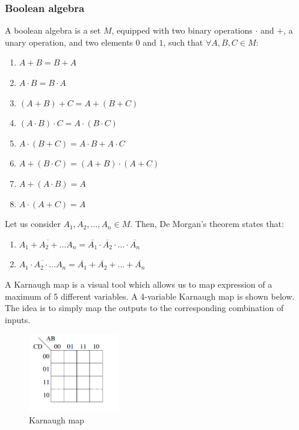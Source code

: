 \documentclass{article}
\begin{document}
\subsubsection{Boolean algebra}

\begin{definition}
    A boolean algebra is a set $M$, equipped with two binary operations $\cdot$ and $+$, a unary operation, and two elements $0$ and $1$, such that $\forall A, B, C \in M$:
    \begin{enumerate}
        \item $A + B = B + A$
        \item $A \cdot B = B \cdot A$
        \item $(A + B) + C = A + (B + C)$
        \item $(A \cdot B) \cdot C = A \cdot (B \cdot C)$
        \item $A \cdot (B + C) = A \cdot B + A \cdot C$
        \item $A + (B \cdot C) = (A + B) \cdot (A + C)$
        \item $A + (A \cdot B) = A$
        \item $A \cdot (A + C) = A$ 
    \end{enumerate}
\end{definition}

\begin{theorem}
    Let us consider $A_1, A_2, \ldots, A_n \in M$. Then, De Morgan's theorem states that:
    \begin{enumerate}
        \item $\overline{A_1 + A_2 + \ldots A_n} = \overline{A_1} \cdot \overline{A_2} \cdot \ldots \cdot \overline{A_n}$
        \item $\overline{A_1 \cdot A_2 \cdot \ldots A_n} = \overline{A_1} + \overline{A_2} + \ldots + \overline{A_n}$
    \end{enumerate}
\end{theorem}

\begin{proposition}
    A Karnaugh map is a visual tool which allows us to map expression of a maximum of 5 different variables. A 4-variable Karnaugh map is shown below. The idea is to simply map the outputs to the corresponding combination of inputs.
\end{proposition}

\begin{figure}[h]
    \centering
    \includegraphics[width = 0.35\textwidth]{images/Screenshot 2024-04-06 115451.png}
    \caption{Karnaugh map}
    \label{fig:enter-label}
\end{figure}
\end{document}
